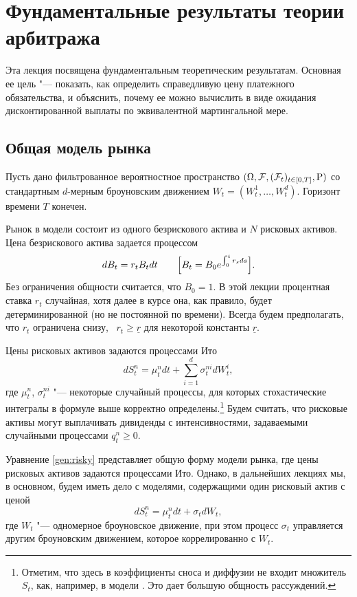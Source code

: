 
\chapter{Фундаментальные результаты теории арбитража}
\label{ch:general}
\chaptertoc

Эта лекция посвящена фундаментальным теоретическим результатам.
Основная ее цель "--- показать, как определить справедливую цену платежного обязательства, и объяснить, почему ее можно вычислить в виде ожидания дисконтированной выплаты по эквивалентной мартингальной мере.


\section{Общая модель рынка}

Пусть дано фильтрованное вероятностное пространство $(\Omega,\mathcal{F},(\mathcal{F}_t)_{t\in[0,T]},\mathrm{P})$ со стандартным $d$-мерным броуновским движением $W_t=(W_t^1,\dots,W_t^d)$. 
Горизонт времени $T$ конечен.

Рынок в модели состоит из одного безрискового актива и $N$ рисковых активов.
Цена безрискового актива задается процессом
\[
d B_t = r_tB_t dt \qquad\Bigl[B_t = B_0 e^{\int_0^t r_s ds}\Bigr].
\] 
Без ограничения общности считается, что $B_0=1$.
В этой лекции процентная ставка $r_t$ случайная, хотя далее в курсе она, как правило, будет детерминированной (но не постоянной по времени).
Всегда будем предполагать, что $r_t$ ограничена снизу, \te\ $r_t\ge\underline r$ для некоторой константы $\underline r$.

Цены рисковых активов задаются процессами Ито
\begin{equation}
\label{gen:risky}
d S_t^n = \mu_t^n dt + \sum_{i=1}^d \sigma^{ni}_t d W_t^i,
\end{equation}
где $\mu_t^n$, $\sigma_t^{ni}$ "--- некоторые случайный процессы, для которых стохастические интегралы в формуле выше корректно определены.\footnote{Отметим, что здесь в коэффициенты сноса и диффузии не входит множитель $S_t$, как, например, в модели \bs.
Это дает большую общность рассуждений.}
Будем считать, что рисковые активы могут выплачивать дивиденды с интенсивностями, задаваемыми случайными процессами $q_t^n\ge0$.

\begin{remark}
Уравнение \eqref{gen:risky} представляет общую форму модели рынка, где цены рисковых активов задаются процессами Ито.
Однако, в дальнейших лекциях мы, в основном, будем иметь дело с моделями, содержащими один рисковый актив с ценой
\begin{equation}
\label{gen:risky-simple}
d S_t^n = \mu_t^n dt + \sigma_t d W_t,
\end{equation}
где $W_t$ "--- одномерное броуновское движение, при этом процесс $\sigma_t$ управляется другим броуновским движением, которое коррелированно с $W_t$.
\end{remark}

